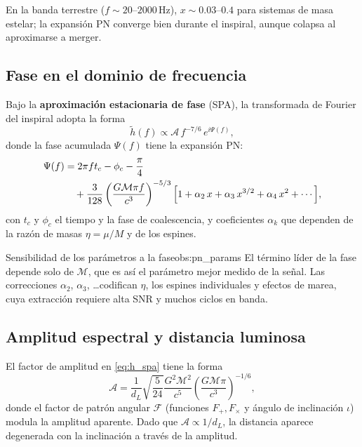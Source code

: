 En la banda terrestre ($f \sim 20\text{--}2000\,\mathrm{Hz}$), $x \sim 0.03\text{--}0.4$ para sistemas de masa estelar; la expansión PN converge bien durante el inspiral, aunque colapsa al aproximarse a merger.

\subsection{Fase en el dominio de frecuencia}

Bajo la \textbf{aproximación estacionaria de fase} (SPA), la transformada de Fourier del inspiral adopta la forma
\begin{equation}
  \tilde{h}(f) \propto \mathcal{A}\,f^{-7/6}\,e^{i\Psi(f)},
  \label{eq:h_spa}
\end{equation}
donde la fase acumulada $\Psi(f)$ tiene la expansión PN:
\begin{align}
  \Psi(f) &= 2\pi f t_c - \phi_c - \frac{\pi}{4} \nonumber\\
  &\quad + \frac{3}{128}\left(\frac{G\mathcal{M}\pi f}{c^3}\right)^{-5/3}
    \Bigl[1 + \alpha_2\,x + \alpha_3\,x^{3/2} + \alpha_4\,x^2 + \cdots\Bigr],
  \label{eq:pn_phase}
\end{align}
con $t_c$ y $\phi_c$ el tiempo y la fase de coalescencia, y coeficientes $\alpha_k$ que dependen de la razón de masas $\eta = \mu/M$ y de los espines.

\begin{observacion}{Sensibilidad de los parámetros a la fase}{obs:pn_params}
El término líder de la fase depende solo de $\mathcal{M}$, que es así el parámetro mejor medido de la señal. Las correcciones $\alpha_2$, $\alpha_3$, \ldots codifican $\eta$, los espines individuales y efectos de marea, cuya extracción requiere alta SNR y muchos ciclos en banda.
\end{observacion}

\subsection{Amplitud espectral y distancia luminosa}

El factor de amplitud en \eqref{eq:h_spa} tiene la forma
\begin{equation}
  \mathcal{A} = \frac{1}{d_L}\sqrt{\frac{5}{24}}\frac{G^2 \mathcal{M}^2}{c^5}
    \left(\frac{G\mathcal{M}\pi}{c^3}\right)^{-1/6},
  \label{eq:amplitude_spa}
\end{equation}
donde el factor de patrón angular $\mathcal{F}$ (funciones $F_+, F_\times$ y ángulo de inclinación $\iota$) modula la amplitud aparente. Dado que $\mathcal{A}\propto 1/d_L$, la distancia aparece degenerada con la inclinación a través de la amplitud.

